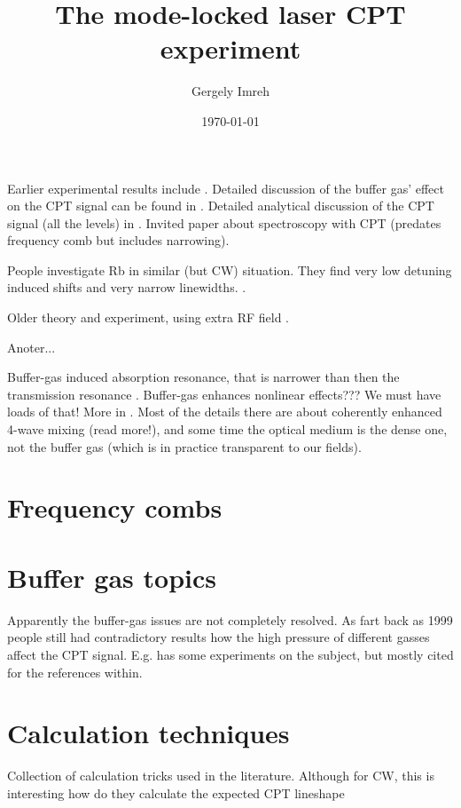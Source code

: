 \documentclass[10pt,a4paper]{article}
\title{The mode-locked laser CPT experiment}
\author{Gergely Imreh}
\date{\today}
\begin{document}
\maketitle

Earlier experimental results include \cite{Brandt1997}.
Detailed discussion of the buffer gas' effect on the CPT signal can be found in \cite{Erhard2001}.
Detailed analytical discussion of the CPT signal (all the levels) in \cite{Taichenachev2003}.
Invited paper about spectroscopy with CPT \cite{Taichenachev2003} (predates frequency comb but includes narrowing).

People investigate Rb in similar (but CW) situation. They find very low detuning induced shifts and very narrow linewidths. \cite{Erhard2000}.

Older theory and experiment, using extra RF field \cite{Vanier1998}.

Anoter... \cite{Vanier1998}

Buffer-gas induced absorption resonance, that is narrower than then the transmission resonance \cite{Mikhailov2004}. Buffer-gas enhances nonlinear effects??? We must have loads of that! More in \cite{Mikhailov2004,Lukin1997,Harris1999,Johnsson2002}. Most of the details there are about coherently enhanced 4-wave mixing (read more!), and some time the optical medium is the dense one, not the buffer gas (which is in practice transparent to our fields).

\section{Frequency combs}

\section{Buffer gas topics}

Apparently the buffer-gas issues are not completely resolved. As fart back as 1999 people still had contradictory results how the high pressure of different gasses affect the CPT signal. E.g. \cite{Gozzini1999} has some experiments on the subject, but mostly cited for the references within.

\section{Calculation techniques}

Collection of calculation tricks used in the literature.
Although for CW, this is interesting how do they calculate the expected CPT lineshape \cite{Novikova2005}
\end{document}
